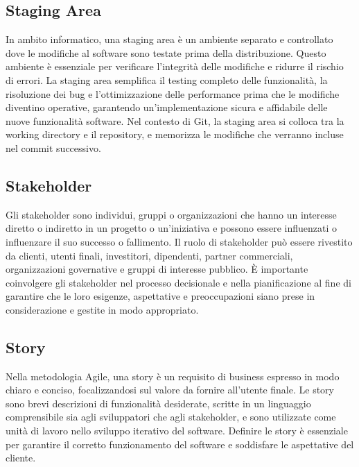 \vspace{2em}
\subsection*{Staging Area}
\par In ambito informatico, una staging area è un ambiente separato e controllato dove le modifiche al software sono testate prima della distribuzione. Questo ambiente è essenziale per verificare l'integrità delle modifiche e ridurre il rischio di errori. La staging area semplifica il testing completo delle funzionalità, la risoluzione dei bug e l'ottimizzazione delle performance prima che le modifiche diventino operative, garantendo un'implementazione sicura e affidabile delle nuove funzionalità software. Nel contesto di Git, la staging area si colloca tra la working directory e il repository, e memorizza le modifiche che verranno incluse nel commit successivo.

\vspace{2em}
\subsection*{Stakeholder}
\par Gli stakeholder sono individui, gruppi o organizzazioni che hanno un interesse diretto o indiretto in un progetto o un'iniziativa e possono essere influenzati o influenzare il suo successo o fallimento. Il ruolo di stakeholder può essere rivestito da clienti, utenti finali, investitori, dipendenti, partner commerciali, organizzazioni governative e gruppi di interesse pubblico. È importante coinvolgere gli stakeholder nel processo decisionale e nella pianificazione al fine di garantire che le loro esigenze, aspettative e preoccupazioni siano prese in considerazione e gestite in modo appropriato.

\vspace{2em}
\subsection*{Story}
\par Nella metodologia Agile, una story è un requisito di business espresso in modo chiaro e conciso, focalizzandosi sul valore da fornire all'utente finale. Le story sono brevi descrizioni di funzionalità desiderate, scritte in un linguaggio comprensibile sia agli sviluppatori che agli stakeholder, e sono utilizzate come unità di lavoro nello sviluppo iterativo del software. Definire le story è essenziale per garantire il corretto funzionamento del software e soddisfare le aspettative del cliente.

